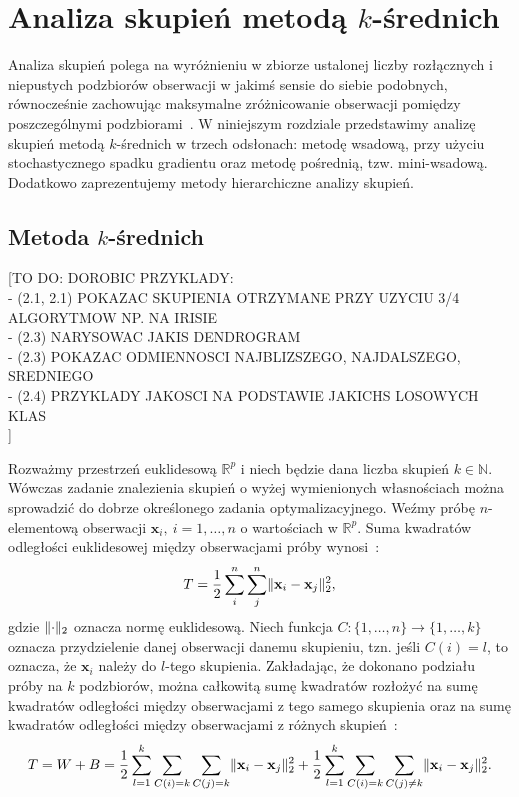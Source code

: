 \documentclass{praca1}
\DeclarePairedDelimiter{\norm}{\lVert}{\rVert}
\begin{document}
\chapter{Analiza skupień metodą $k$-średnich}
\label{analiza-skupien}

Analiza skupień polega na wyróżnieniu w zbiorze ustalonej liczby rozłącznych i niepustych podzbiorów obserwacji w jakimś sensie do siebie podobnych, równocześnie zachowując maksymalne zróżnicowanie obserwacji pomiędzy poszczególnymi podzbiorami~\cite{Koronacki2005:statystyczne}. W niniejszym rozdziale przedstawimy analizę skupień metodą $k$-średnich w trzech odsłonach: metodę wsadową, przy użyciu stochastycznego spadku gradientu oraz metodę pośrednią, tzw. mini-wsadową. Dodatkowo zaprezentujemy metody hierarchiczne analizy skupień.

\section{Metoda $k$-średnich}

[TO DO: DOROBIC PRZYKLADY:\\
- (2.1, 2.1) POKAZAC SKUPIENIA OTRZYMANE PRZY UZYCIU 3/4 ALGORYTMOW NP. NA IRISIE\\
- (2.3) NARYSOWAC JAKIS DENDROGRAM\\
- (2.3) POKAZAC ODMIENNOSCI NAJBLIZSZEGO, NAJDALSZEGO, SREDNIEGO\\
- (2.4) PRZYKLADY JAKOSCI NA PODSTAWIE JAKICHS LOSOWYCH KLAS\\]

Rozważmy przestrzeń euklidesową $\mathbb{R}^p$ i niech będzie dana liczba skupień $k\in \mathbb{N}$. Wówczas zadanie znalezienia skupień o wyżej wymienionych własnościach można sprowadzić do dobrze określonego zadania optymalizacyjnego. Weźmy próbę $n$-elementową obserwacji $\mathbf{x}_i,\ i = 1,\ldots,n$ o wartościach w $\mathbb{R}^p$. %
Suma kwadratów odległości euklidesowej między obserwacjami próby wynosi~\cite{Koronacki2005:statystyczne}:
\begin{equation}
T = \frac{1}{2}\sum\limits_{i}^{n}\sum\limits_{j}^{n} \norm{\mathbf{x}_i - \mathbf{x}_j}_2^2,
\end{equation}
gdzie $\norm{\cdot}_2$ oznacza normę euklidesową. Niech funkcja $C:\{1,\ldots,n\} \rightarrow \{1,\ldots, k\}$ oznacza przydzielenie danej obserwacji danemu skupieniu, tzn. jeśli $C(i) = l$, to oznacza, że $\mathbf{x}_i$ należy do $l$-tego skupienia. Zakładając, że dokonano podziału próby na $k$ podzbiorów, można całkowitą sumę kwadratów rozłożyć na sumę kwadratów odległości między obserwacjami z tego samego skupienia oraz na sumę kwadratów odległości między obserwacjami z różnych skupień~\cite{Koronacki2005:statystyczne}:
\begin{equation}
T = W + B = \frac{1}{2}\sum\limits_{l=1}^{k}\sum\limits_{C(i) = k}\sum\limits_{C(j) = k} \norm{\mathbf{x}_i - \mathbf{x}_j}_2^2 + \frac{1}{2}\sum\limits_{l=1}^{k}\sum\limits_{C(i) = k}\sum\limits_{C(j) \neq k} \norm{\mathbf{x}_i - \mathbf{x}_j}_2^2.
\end{equation}
\end{document}
